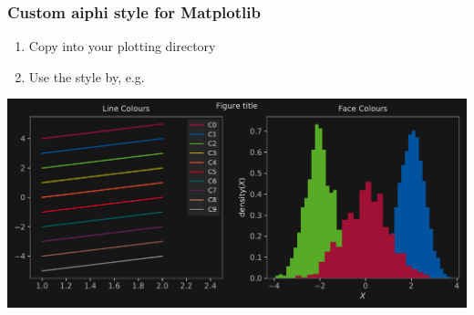 \documentclass[mathserif, fleqn]{beamer}
\begin{document}
\begin{frame}\frametitle{Custom aiphi style for Matplotlib}
  \begin{center}
    \begin{enumerate}
    \item Copy  into your plotting directory
    \item Use the style by, e.g.\ 
    \end{enumerate}
    \vfill
    \includegraphics[height=0.6\paperheight]{extra/plots.pdf}
    \vspace{-1.5em}
  \end{center}
\end{frame}

%         
\end{document}
